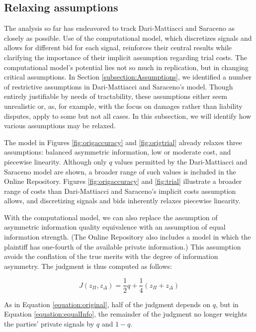 \documentclass{article}
\begin{document}
\subsection{Relaxing assumptions}

The analysis so far has endeavored to track Dari-Mattiacci and Saraceno as closely as possible. Use of the computational model, which discretizes signals and allows for  different bid for each signal, reinforces their central results while clarifying the importance of their implicit assumption regarding trial costs. The computational model's potential lies not so much in replication, but in changing critical assumptions. In Section \ref{subsection:Assumptions}, we identified a number of restrictive assumptions in Dari-Mattiacci and Saraceno's model. Though entirely justifiable by needs of tractability, these assumptions either seem unrealistic or, as, for example, with the focus on damages rather than liability disputes, apply to some but not all cases. In this subsection, we will identify how various assumptions may be relaxed.

The model in Figures \ref{fig:origaccuracy} and \ref{fig:origtrial} already relaxes three assumptions: balanced asymmetric information, low or moderate cost, and piecewise linearity. Although only $q$ values permitted by the Dari-Mattiacci and Saraceno model are shown, a broader range of such values is included in the Online Repository. Figures \ref{fig:origaccuracy} and \ref{fig:trial} illustrate a broader range of costs than Dari-Mattiacci and Saraceno's implicit costs assumption allows, and discretizing signals and bids inherently relaxes piecewise linearity.

With the computational model, we can also replace the assumption of asymmetric information quality equivalence with an assumption of equal information strength. (The Online Repository also includes a model in which the plaintiff has one-fourth of the available private information.) This assumption avoids the conflation of the true merits with the degree of information asymmetry. The judgment is thus computed as follows:

\begin{equation} \label{equation:equalInfo}
J(z_\Pi, z_\Delta) = \frac{1}{2}q + \frac{1}{4} (z_\Pi+z_\Delta)
\end{equation}

\noindent As in Equation \ref{equation:original}, half of the judgment depends on $q$, but in Equation \ref{equation:equalInfo}, the remainder of the judgment no longer weights the parties' private signals by $q$ and $1-q$.
\end{document}
